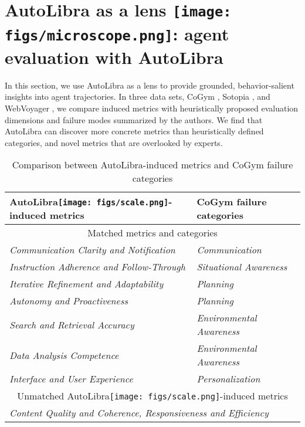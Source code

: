 \section{\texorpdfstring{AutoLibra as a lens \texttt{[image: figs/microscope.png]}: agent evaluation with AutoLibra}{AutoLibra as a lens: agent evaluation with AutoLibra}}
\label{sec:lens}

In this section, we use AutoLibra as a lens to provide grounded, behavior-salient insights into agent trajectories. In three data sets, CoGym \citep{shao2024collaborative}, Sotopia \citep{zhousotopia}, and WebVoyager \citep{he2024webvoyager}, we compare induced metrics with heuristically proposed evaluation dimensions and failure modes summarized by the authors. We find that AutoLibra can discover more concrete metrics than heuristically defined categories, and novel metrics that are overlooked by experts. 

\begin{table}[!h]
\centering
\begin{tabular}{ll}
    \toprule
    AutoLibra\protect\texttt{[image: figs/scale.png]}-induced metrics & CoGym failure categories\\\midrule
    \multicolumn{2}{c}{Matched metrics and categories}\\\midrule
    \emph{Communication Clarity and Notification} & \textit{Communication} \\
    \textit{Instruction Adherence and Follow-Through} & \textit{Situational Awareness} \\
    \textit{Iterative Refinement and Adaptability} & \textit{Planning}\\
    \textit{Autonomy and Proactiveness} & \textit{Planning} \\
    \textit{Search and Retrieval Accuracy} & \textit{Environmental Awareness} \\
    \textit{Data Analysis Competence} & \textit{Environmental Awareness} \\
    \textit{Interface and User Experience} & \textit{Personalization} \\\midrule
    \multicolumn{2}{c}{Unmatched AutoLibra\protect\texttt{[image: figs/scale.png]}-induced metrics}\\\midrule
     \multicolumn{2}{C{0.8\textwidth}}{\textit{Content Quality and Coherence, Responsiveness and Efficiency}} \\ \bottomrule
\end{tabular}
\caption{Comparison between AutoLibra-induced metrics and CoGym failure categories}
\label{tab:lens_cogym}
\end{table}

